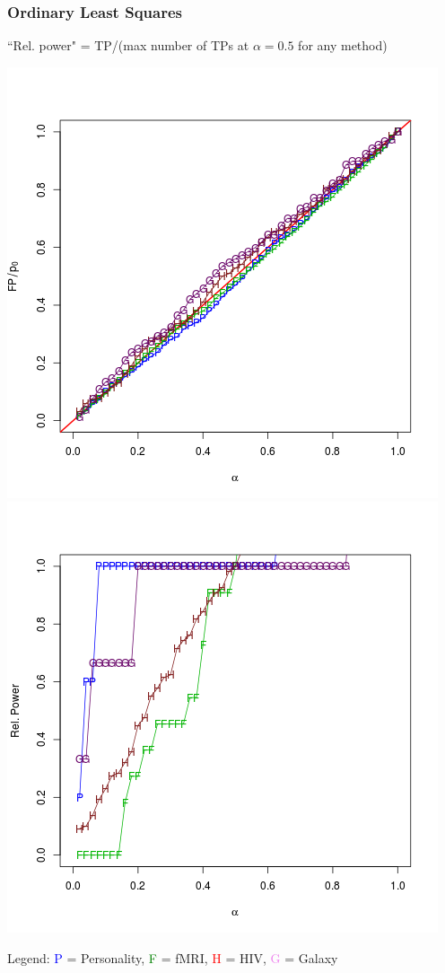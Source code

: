 \documentclass{beamer}
\begin{document}
\begin{frame}
\frametitle{Ordinary Least Squares}
``Rel. power" =  TP/(max number of TPs  at $\alpha = 0.5$ for any method)

\begin{center}
\includegraphics[scale = 0.3]{res_o_type1.png}
\includegraphics[scale = 0.3]{res_o_power.png}
\end{center}

Legend: \textcolor{blue}{P} = Personality, \textcolor{green}{F} = fMRI,
\textcolor{red}{H} = HIV, \textcolor{violet}{G} = Galaxy
\end{frame}
\end{document}
